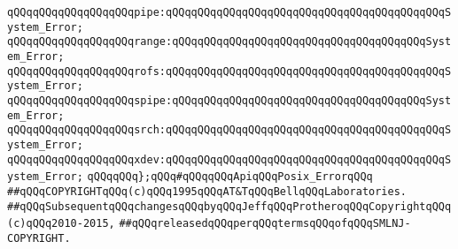 \verb|qQQqqQQqqQQqqQQqqQQqpipe:qQQqqQQqqQQqqQQqqQQqqQQqqQQqqQQqqQQqqQQqqQQqSystem_Error;|\newline
\verb|qQQqqQQqqQQqqQQqqQQqrange:qQQqqQQqqQQqqQQqqQQqqQQqqQQqqQQqqQQqqQQqSystem_Error;|\newline
\verb|qQQqqQQqqQQqqQQqqQQqrofs:qQQqqQQqqQQqqQQqqQQqqQQqqQQqqQQqqQQqqQQqqQQqSystem_Error;|\newline
\verb|qQQqqQQqqQQqqQQqqQQqspipe:qQQqqQQqqQQqqQQqqQQqqQQqqQQqqQQqqQQqqQQqSystem_Error;|\newline
\verb|qQQqqQQqqQQqqQQqqQQqsrch:qQQqqQQqqQQqqQQqqQQqqQQqqQQqqQQqqQQqqQQqqQQqSystem_Error;|\newline
\verb|qQQqqQQqqQQqqQQqqQQqxdev:qQQqqQQqqQQqqQQqqQQqqQQqqQQqqQQqqQQqqQQqqQQqSystem_Error;|\newline
\newline
\verb|qQQqqQQq};qQQq#qQQqqQQqApiqQQqPosix_ErrorqQQq|\newline
\newline
\newline
\newline
\verb|##qQQqCOPYRIGHTqQQq(c)qQQq1995qQQqAT&TqQQqBellqQQqLaboratories.|\newline
\verb|##qQQqSubsequentqQQqchangesqQQqbyqQQqJeffqQQqProtheroqQQqCopyrightqQQq(c)qQQq2010-2015,|\newline
\verb|##qQQqreleasedqQQqperqQQqtermsqQQqofqQQqSMLNJ-COPYRIGHT.|\newline

